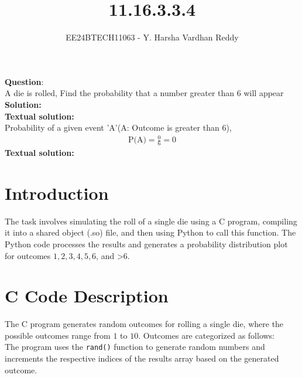 \documentclass[journal]{IEEEtran}
\begin{document}
	
	
	\vspace{3cm}
	
	\title{11.16.3.3.4}
	\author{EE24BTECH11063 - Y. Harsha Vardhan Reddy }
	{\let\newpage\relax\maketitle}
	
	\renewcommand{\thefigure}{\theenumi}
	\renewcommand{\thetable}{\theenumi}
	\setlength{\intextsep}{10pt} %
	
	
	\renewcommand{\thetable}{\theenumi}
	
	
\textbf{Question}:\\
A die is rolled, Find the probability that a number greater than 6 will appear \\
\textbf{Solution: }\\
\textbf{Textual solution: }\\
Probability of a given event 'A'(A: Outcome is greater than 6),\\
\begin{align}
    \text{P(A)}=\frac{0}{6}=0
\end{align}
\textbf{Textual solution: }\\

\section*{Introduction}
The task involves simulating the roll of a single die using a C program, compiling it into a shared object (.so) file, and then using Python to call this function. The Python code processes the results and generates a probability distribution plot for outcomes \(1, 2, 3, 4, 5, 6\), and \textgreater6.

\section*{C Code Description}
The C program generates random outcomes for rolling a single die, where the possible outcomes range from \(1\) to \(10\). Outcomes are categorized as follows:\\
The program uses the \texttt{rand()} function to generate random numbers and increments the respective indices of the results array based on the generated outcome.
\end{document}

